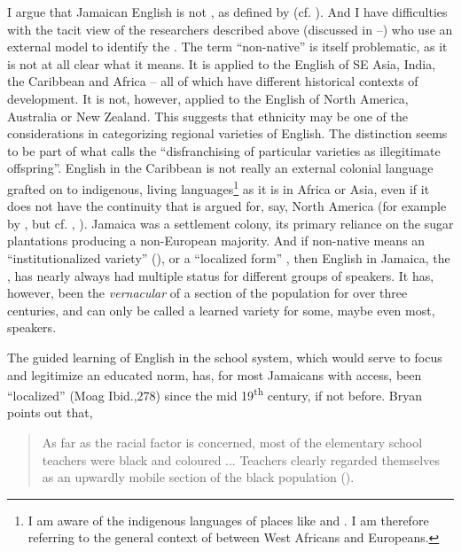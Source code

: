 I argue that Jamaican English is not , as defined by \citet[31]{Kachru1982} (cf. \citealt[270]{Moag1982}).  And I have difficulties with the tacit view of the researchers described above (discussed in --) who use an external model to identify the .  The term “non-native” is itself problematic, as it is not at all clear what it means.  It is applied to the English of SE Asia, India, the Caribbean and Africa – all of which have different historical contexts of development.  It is not, however, applied to the English of North America, Australia or New Zealand.  This suggests that ethnicity may be one of the considerations in categorizing regional varieties of English.  The distinction seems to be part of what \citet[107]{Mufwene2001} calls the “disfranchising of particular varieties as illegitimate offspring”.  English in the Caribbean is not really an external colonial language grafted on to indigenous, living languages\footnote{I am aware of the indigenous languages of places like  and .  I am therefore referring to the general context of  between West Africans and Europeans.} as it is in Africa or Asia, even if it does not have the continuity that is argued for, say, North America (for example by \citealt{Fisher2001}, but cf. \citealt{Görlach1987}, \citealt{Mufwene2001}).  Jamaica was a settlement colony, its primary reliance on the sugar plantations producing a non-European majority.  And if non-native means an “institutionalized variety” (\citealt[38--40]{Kachru1982}), or a “localized form” \citep[24]{Strevens1982}, then English in Jamaica, the , has nearly always had multiple status for different groups of speakers.  It has, however, been the \textit{vernacular} of a section of the population for over three centuries, and can only be called a learned variety for some, maybe even most, speakers.

The guided learning of English in the school system, which would serve to focus and legitimize an educated norm, has, for most Jamaicans with access, been “localized” (Moag Ibid.,278) since the mid 19\textsuperscript{th} century, if not before.  Bryan points out that,

\begin{quote}As far as the racial factor is concerned, most of the elementary school teachers were black and coloured ... Teachers clearly regarded themselves as an upwardly mobile section of the black population (\citealt[287--288]{Bryan1996}).\end{quote}

